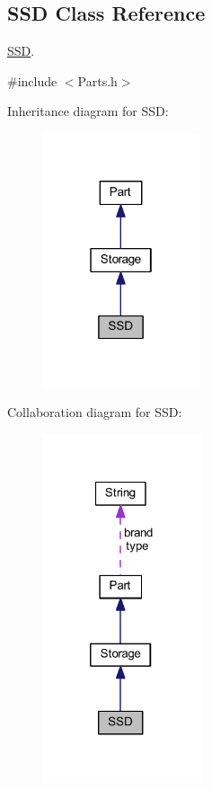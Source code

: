 \hypertarget{class_s_s_d}{}\subsection{S\+SD Class Reference}
\label{class_s_s_d}


\mbox{\hyperlink{class_s_s_d}{S\+SD}}.  




{\ttfamily \#include $<$Parts.\+h$>$}



Inheritance diagram for S\+SD\+:
\nopagebreak
\begin{figure}[H]
\begin{center}
\leavevmode
\includegraphics[width=130pt]{class_s_s_d__inherit__graph}
\end{center}
\end{figure}


Collaboration diagram for S\+SD\+:
\nopagebreak
\begin{figure}[H]
\begin{center}
\leavevmode
\includegraphics[width=133pt]{class_s_s_d__coll__graph}
\end{center}
\end{figure}
